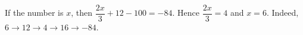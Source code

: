If the number is $x$, then $\dfrac{2x}{3}+12-100=-84$. Hence $\dfrac{2x}{3}=4$ and $\boxed{x=6}$. Indeed, $6\to12\to4\to16\to-84$.
